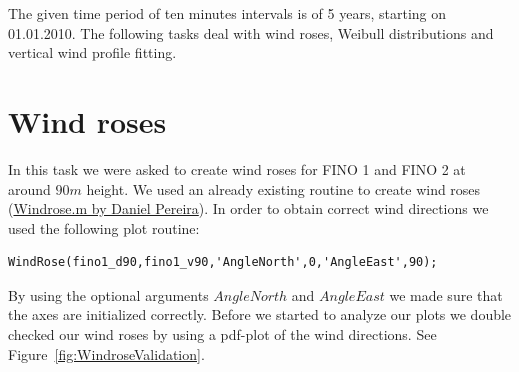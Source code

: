 \documentclass[10pt]{article}
\begin{document}
The given time period of ten minutes intervals is of 5 years, starting on 01.01.2010. The following tasks deal with wind roses, Weibull distributions and vertical wind profile fitting.
\newpage
\section{Wind roses}
In this task we were asked to create wind roses for FINO 1 and FINO 2 at around $90m$ height. We
used an already existing routine to create wind roses (\href{http://www.mathworks.com/matlabcentral/fileexchange/47248-wind-rose/content/WindRose.m}{Windrose.m by Daniel Pereira}).
In order to obtain correct wind directions we used the following plot routine:\\
\begin{lstlisting}
WindRose(fino1_d90,fino1_v90,'AngleNorth',0,'AngleEast',90);
\end{lstlisting}
By using the optional arguments $AngleNorth$ and $AngleEast$ we made sure that the axes are initialized correctly.
Before we started to analyze our plots we double checked our wind roses by using a pdf-plot of the wind directions. See Figure~\ref{fig:WindroseValidation}.
\end{document}
